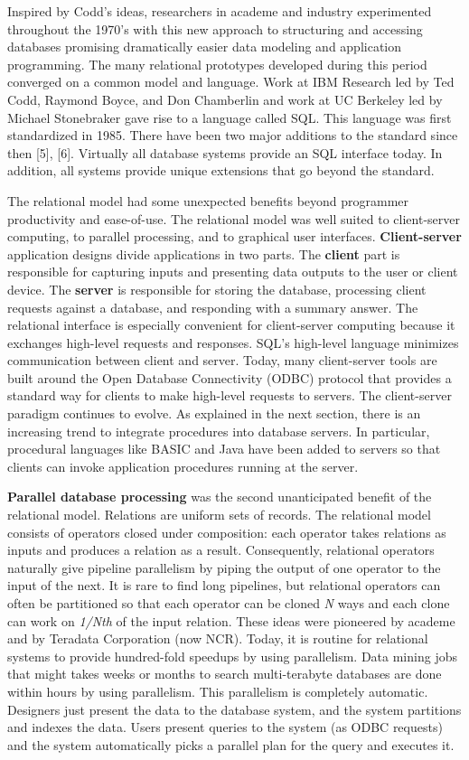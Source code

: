 \documentclass[a4paper,12pt,notitlepage,twoside,openright]{article}
\begin{document}
Inspired by Codd's ideas, researchers in academe and industry
experimented throughout the 1970's with this new approach to structuring
and accessing databases promising dramatically easier data modeling and
application programming. The many relational prototypes developed during
this period converged on a common model and language. Work at IBM
Research led by Ted Codd, Raymond Boyce, and Don Chamberlin and work at
UC Berkeley led by Michael Stonebraker gave rise to a language called
SQL. This language was first standardized in 1985. There have been two
major additions to the standard since then {[}5{]}, {[}6{]}. Virtually
all database systems provide an SQL interface today. In addition, all
systems provide unique extensions that go beyond the standard.

The relational model had some unexpected benefits beyond programmer
productivity and ease-of-use. The relational model was well suited to
client-server computing, to parallel processing, and to graphical user
interfaces. \textbf{Client-server} application designs divide
applications in two parts. The \textbf{client} part is responsible for
capturing inputs and presenting data outputs to the user or client
device. The \textbf{server} is responsible for storing the database,
processing client requests against a database, and responding with a
summary answer. The relational interface is especially convenient for
client-server computing because it exchanges high-level requests and
responses. SQL's high-level language minimizes communication between
client and server. Today, many client-server tools are built around the
Open Database Connectivity (ODBC) protocol that provides a standard way
for clients to make high-level requests to servers. The client-server
paradigm continues to evolve. As explained in the next section, there is
an increasing trend to integrate procedures into database servers. In
particular, procedural languages like BASIC and Java have been added to
servers so that clients can invoke application procedures running at the
server.

\textbf{Parallel database processing} was the second unanticipated
benefit of the relational model. Relations are uniform sets of records.
The relational model consists of operators closed under composition:
each operator takes relations as inputs and produces a relation as a
result. Consequently, relational operators naturally give pipeline
parallelism by piping the output of one operator to the input of the
next. It is rare to find long pipelines, but relational operators can
often be partitioned so that each operator can be cloned \emph{N} ways
and each clone can work on \emph{1/Nth} of the input relation. These
ideas were pioneered by academe and by Teradata Corporation (now NCR).
Today, it is routine for relational systems to provide hundred-fold
speedups by using parallelism. Data mining jobs that might takes weeks
or months to search multi-terabyte databases are done within hours by
using parallelism. This parallelism is completely automatic. Designers
just present the data to the database system, and the system partitions
and indexes the data. Users present queries to the system (as ODBC
requests) and the system automatically picks a parallel plan for the
query and executes it.
\end{document}
